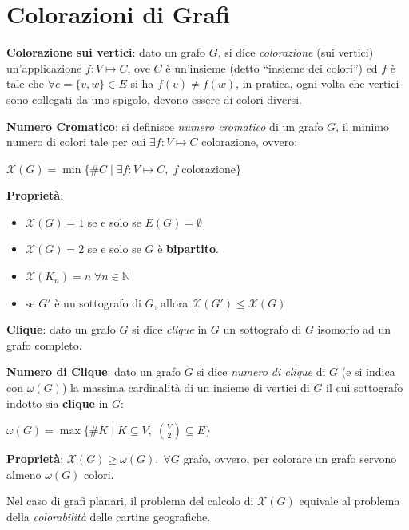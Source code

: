 \section{Colorazioni di Grafi}
\begin{flushleft}
    \textbf{Colorazione sui vertici}: dato un grafo $G$, si dice \textit{colorazione} (sui vertici) un'applicazione $f: V \mapsto C$, ove $C$ è un'insieme (detto ``insieme dei colori'') ed $f$ è tale che $\forall e = \{v, w\} \in E$ si ha $f(v) \neq f(w)$, in pratica, ogni volta che  vertici sono collegati da uno spigolo, devono essere di colori diversi.

    \textbf{Numero Cromatico}: si definisce \textit{numero cromatico} di un grafo $G$, il minimo numero di colori tale per cui $\exists f: V \mapsto C$ colorazione, ovvero:

    {\centering
        $\mathcal{X}(G) = \min \{\# C \; | \; \exists f: V \mapsto C, \; f \; \text{colorazione}\}$
    \par}
    \textbf{Proprietà}:
    \begin{itemize}[nosep]
        \item $\mathcal{X}(G) = 1$ se e solo se $E(G) = \emptyset$
        \item $\mathcal{X}(G) = 2$ se e solo se $G$ è \textbf{bipartito}.
        \item $\mathcal{X}(K_n) = n \; \forall n \in \mathbb{N}$
        \item se $G'$ è un sottografo di $G$, allora $\mathcal{X}(G') \leq \mathcal{X}(G)$
    \end{itemize}

    \textbf{Clique}: dato un grafo $G$ si dice \textit{clique} in $G$ un sottografo di $G$ isomorfo ad un grafo completo.
    
    \textbf{Numero di Clique}: dato un grafo $G$ si dice \textit{numero di clique} di $G$ (e si indica con $\omega(G)$) la massima cardinalità di un insieme di vertici di $G$ il cui sottografo indotto sia \textbf{clique} in $G$:

    {\centering
        $\omega(G) = \max \{\# K \; | \; K \subseteq V, \; \binom{V}{2} \subseteq E\}$
    \par}
    \textbf{Proprietà}: $\mathcal{X}(G) \geq \omega(G), \; \forall G$ grafo, ovvero, per colorare un grafo servono almeno $\omega(G)$ colori.

    Nel caso di grafi planari, il problema del calcolo di $\mathcal{X}(G)$ equivale al problema della \textit{colorabilità} delle cartine geografiche.


\end{flushleft}
